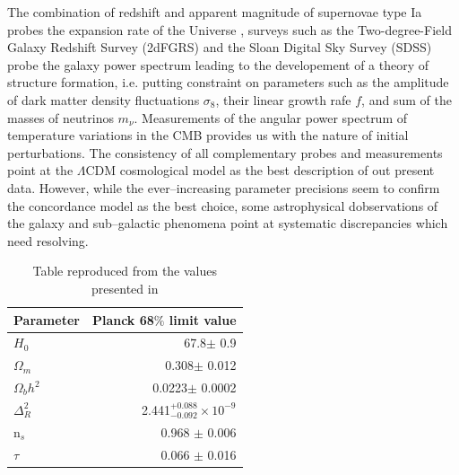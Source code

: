 \documentclass[paper=a4, fontsize=11pt]{scrartcl} %
\numberwithin{equation}{section} %
\numberwithin{figure}{section} %
\numberwithin{table}{section} %
\begin{document}
The combination of redshift and apparent magnitude of supernovae type Ia probes the expansion rate of the Universe \citep[][]{SNeIa}, surveys such as the Two-degree-Field Galaxy Redshift Survey (2dFGRS) \citep[][]{2dFGRS} and the Sloan Digital Sky Survey (SDSS) \citep[][]{SDSS} probe the galaxy power spectrum leading to the developement of a theory of structure formation, i.e. putting constraint on parameters such as the amplitude of dark matter density fluctuations $\sigma_8$, their linear growth rafe $f$, and sum of the masses of neutrinos $m_\nu$. Measurements of the angular power spectrum of temperature variations in the CMB \citep[COBE, WMAP, Planck][]{} provides us with the nature of initial perturbations. The consistency of all complementary probes and measurements point at the $\Lambda$CDM cosmological model as the best description of out present data. However, while the ever--increasing parameter precisions seem to confirm the concordance model as the best choice, some astrophysical dobservations of the galaxy and sub--galactic phenomena point at systematic discrepancies which need resolving.

\begin{table}
\begin{tabular}{l{}r}
\label{tab:LCDM_Planck15}
Parameter              & Planck 68$\%$ limit value \\
\hline
$H_0$ & 67.8$\pm$ 0.9 \\
$\Omega_m$ & 0.308$\pm$ 0.012 \\
$\Omega_b h^2$ & 0.0223$\pm$ 0.0002 \\
$\Delta^2_R$ & 2.441$^{+0.088}_{-0.092} \times 10^{-9}$ \\
n$_s$ & 0.968 $\pm$ 0.006\\
$\tau$ & 0.066 $\pm$ 0.016\\
\end{tabular}
\caption[Table caption text]{Table reproduced from the values presented in \citet[][]{Planck2015}}
\end{table}


\end{document}
